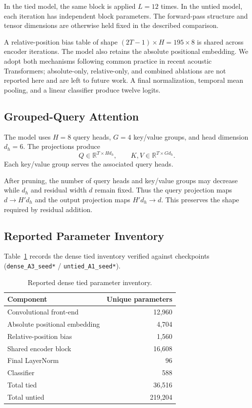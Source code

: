 \documentclass[journal]{IEEEtran}
\begin{document}
In the tied model, the same block is applied $L=12$ times.
In the untied model, each iteration has independent block
parameters.
The forward-pass structure and tensor dimensions are otherwise
held fixed in the described comparison.

A relative-position bias table of shape
$(2T-1)\times H=195\times8$ is shared across encoder iterations.
The model also retains the absolute positional embedding.
We adopt both mechanisms following common practice in recent
acoustic Transformers; absolute-only, relative-only, and combined
ablations are not reported here and are left to future work.
A final normalization, temporal mean pooling, and a linear
classifier produce twelve logits.

\subsection{Grouped-Query Attention}

The model uses $H=8$ query heads, $G=4$ key/value groups,
and head dimension $d_h=6$.
The projections produce
\begin{equation}
Q\in\mathbb{R}^{T\times Hd_h},
\qquad
K,V\in\mathbb{R}^{T\times Gd_h}.
\end{equation}
Each key/value group serves the associated query heads.

After pruning, the number of query heads and key/value groups may
decrease while $d_h$ and residual width $d$ remain fixed.
Thus the query projection maps $d\rightarrow H'd_h$ and the output
projection maps $H'd_h\rightarrow d$.
This preserves the shape required by residual addition.

\subsection{Reported Parameter Inventory}

Table~\ref{tab:inventory} records the dense tied inventory
verified against checkpoints
(\texttt{dense\_A3\_seed*} / \texttt{untied\_A1\_seed*}).

\begin{table}[t]
\caption{Reported dense tied parameter inventory.}
\label{tab:inventory}
\centering
\begin{tabular}{lr}
\toprule
Component & Unique parameters\\
\midrule
Convolutional front-end & 12,960\\
Absolute positional embedding & 4,704\\
Relative-position bias & 1,560\\
Shared encoder block & 16,608\\
Final LayerNorm & 96\\
Classifier & 588\\
\midrule
Total tied & 36,516\\
Total untied & 219,204\\
\bottomrule
\end{tabular}
\end{table}
\end{document}
